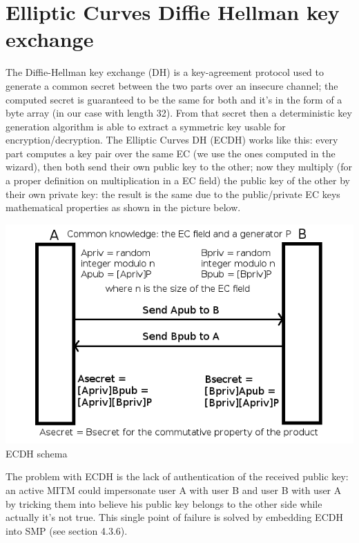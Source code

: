 \section{Elliptic Curves Diffie Hellman key exchange}
The Diffie-Hellman key exchange (DH) is a key-agreement protocol used to generate a common secret between the two parts over an insecure channel; the computed secret is guaranteed to be the same for both and it's in the form of a byte array (in our case with length 32). From that secret then a deterministic key generation algorithm is able to extract a symmetric key usable for encryption/decryption. The Elliptic Curves DH (ECDH) works like this: every part computes a key pair over the same EC (we use the ones computed in the wizard), then both send their own public key to the other; now they multiply (for a proper definition on multiplication in a EC field) the public key of the other by their own private key: the result is the same due to the public/private EC keys mathematical properties as shown in the picture below.\\

\vspace{1cm}
\begin{center}
\includegraphics[scale=0.5]{images/ecdh}\\

\vspace{1cm}
ECDH schema\\
\end{center}

\vspace{1cm}
The problem with ECDH is the lack of authentication of the received public key: an active MITM could impersonate user A with user B and user B with user A by tricking them into believe his public key belongs to the other side while actually it's not true. This single point of failure is solved by embedding ECDH into SMP (see section 4.3.6).